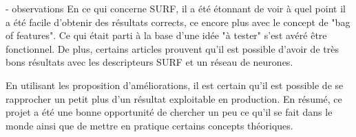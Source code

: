 

- observations
En ce qui concerne SURF, il a été étonnant de voir à quel point il a été facile d'obtenir des résultats corrects, ce encore plus avec le concept de "bag of features". Ce qui était parti à la base d'une idée "à tester" s'est avéré être fonctionnel. De plus, certains articles prouvent qu'il est possible d'avoir de très bons résultats avec les descripteurs SURF et un réseau de neurones\cite{SurfANN}.

En utilisant les proposition d'améliorations, il est certain qu'il est possible de se rapprocher un petit plus d'un résultat exploitable en production. En résumé, ce projet a été une bonne opportunité de chercher un peu ce qu'il se fait dans le monde ainsi que de mettre en pratique certains concepts théoriques.

\todo[inline]{}

